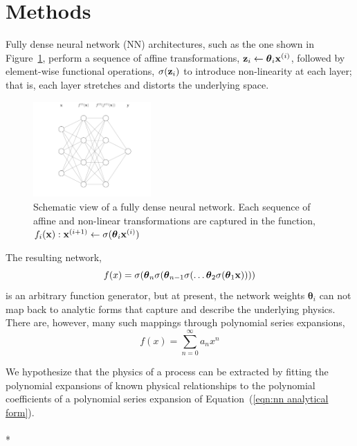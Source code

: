 \section{Methods}\label{methods}

Fully dense neural network (NN) architectures, such as the one shown in Figure~\ref{fig:nn-1}, perform a sequence of affine transformations, ${\bold z}_i \leftarrow \boldsymbol\theta_i {\bold x}^{(i)}$, followed by element-wise functional operations, $\sigma({\bold z}_i)$ to introduce non-linearity at each layer; that is, each layer stretches and distorts the underlying space.
\begin{figure}[htbp]
\begin{center}
\includegraphics[width=0.4\textwidth]{fig/neural-network-01}
\caption{Schematic view of a fully dense neural network. Each sequence of affine and non-linear transformations are captured in the function, $f_i({\bold x}): {\bold x}^{(i+1)} \leftarrow \sigma(\boldsymbol\theta_i {\bold x}^{(i)})$}
\label{fig:nn-1}
\end{center}
\end{figure}

The resulting network,
\begin{equation}
	f(x) = \sigma(\boldsymbol\theta_n \sigma(\boldsymbol\theta_{n-1} \sigma(\ldots \boldsymbol\theta_2 \sigma(\boldsymbol\theta_1{\bold x}))))
	\label{eqn:nn analytical form}
\end{equation}
is an arbitrary function generator, but at present, the network weights $\boldsymbol\theta_i$ can not map back to analytic forms that capture and describe the underlying physics. There are, however, many such mappings through polynomial series expansions,
\begin{equation}
	f(x) = \sum_{n=0}^\infty a_n x^n
\end{equation}

We hypothesize that the physics of a process can be extracted by fitting the polynomial expansions of known physical relationships to the polynomial coefficients of a polynomial series expansion of Equation~(\ref{eqn:nn analytical form}). \\
\\*

